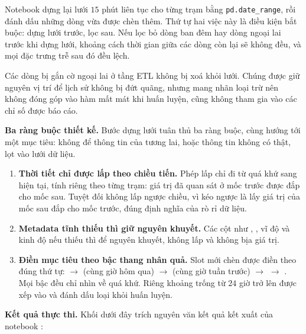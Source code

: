 Notebook  dựng lại lưới $15$ phút liên tục cho từng trạm
bằng \texttt{pd.date\_range}, rồi đánh dấu những dòng vừa được chèn thêm. Thứ tự hai
việc này là điều kiện bắt buộc: dựng lưới trước, lọc sau. Nếu lọc bỏ dòng ban
đêm hay dòng ngoại lai trước khi dựng lưới, khoảng cách thời gian giữa các dòng còn lại
sẽ không đều, và mọi đặc trưng trễ sau đó đều lệch.

Các dòng bị gắn cờ ngoại lai ở tầng ETL không bị xoá khỏi lưới. Chúng được giữ nguyên
vị trí để lịch sử không bị đứt quãng, nhưng mang nhãn loại trừ nên không đóng góp vào
hàm mất mát khi huấn luyện, cũng không tham gia vào các chỉ số được báo cáo.

\textbf{Ba ràng buộc thiết kế.} Bước dựng lưới tuân thủ ba ràng buộc, cùng hướng tới một
mục tiêu: không để thông tin của tương lai, hoặc thông tin không có thật, lọt vào lưới dữ liệu.

\begin{enumerate}
    \item \textbf{Thời tiết chỉ được lấp theo chiều tiến.} Phép lấp chỉ đi từ quá khứ
    sang hiện tại, tính riêng theo từng trạm: giá trị đã quan sát ở mốc trước được đắp cho
    mốc sau. Tuyệt đối không lấp ngược chiều, vì kéo ngược là lấy giá trị của mốc sau đắp
    cho mốc trước, đúng định nghĩa của rò rỉ dữ liệu.
    \item \textbf{Metadata tĩnh thiếu thì giữ nguyên khuyết.} Các cột như
    , , vĩ độ và kinh độ nếu thiếu thì để nguyên
    khuyết, không lấp và không bịa giá trị.
    \item \textbf{Điền mục tiêu theo bậc thang nhân quả.} Slot mới chèn được điền theo đúng
    thứ tự:  $\rightarrow$  (cùng giờ hôm qua)
    $\rightarrow$  (cùng giờ tuần trước) $\rightarrow$
     $\rightarrow$ . Mọi bậc đều chỉ nhìn về
    quá khứ. Riêng khoảng trống từ $24$ giờ trở lên được xếp vào 
    và đánh dấu loại khỏi huấn luyện.
\end{enumerate}

\textbf{Kết quả thực thi.} Khối dưới đây trích nguyên văn kết quả kết xuất của notebook
:

